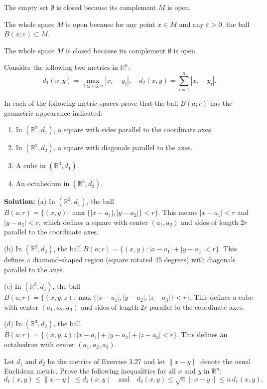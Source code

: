 The empty set $\emptyset$ is closed because its complement $M$ is open.

The whole space $M$ is open because for any point $x \in M$ and any $\varepsilon > 0$, the ball $B(x;\varepsilon) \subset M$.

The whole space $M$ is closed because its complement $\emptyset$ is open.

\begin{problembox}
Consider the following two metrics in \( \mathbb{R}^n \):
\[d_1(x, y) = \max_{1 \leq i \leq n} |x_i - y_i|, \quad d_2(x, y) = \sum_{i=1}^n |x_i - y_i|.\]

In each of the following metric spaces prove that the ball \( B(a; r) \) has the geometric appearance indicated:
\begin{enumerate}[label=\alph*)]
\item In \( (\mathbb{R}^2, d_1) \), a square with sides parallel to the coordinate axes.
\item In \( (\mathbb{R}^2, d_2) \), a square with diagonals parallel to the axes.
\item A cube in \( (\mathbb{R}^3, d_1) \).
\item An octahedron in \( (\mathbb{R}^3, d_2) \).
\end{enumerate}
\end{problembox}

\textbf{Solution:} 
(a) In $(\mathbb{R}^2, d_1)$, the ball $B(a;r) = \{(x,y) : \max\{|x-a_1|, |y-a_2|\} < r\}$. This means $|x-a_1| < r$ and $|y-a_2| < r$, which defines a square with center $(a_1,a_2)$ and sides of length $2r$ parallel to the coordinate axes.

(b) In $(\mathbb{R}^2, d_2)$, the ball $B(a;r) = \{(x,y) : |x-a_1| + |y-a_2| < r\}$. This defines a diamond-shaped region (square rotated 45 degrees) with diagonals parallel to the axes.

(c) In $(\mathbb{R}^3, d_1)$, the ball $B(a;r) = \{(x,y,z) : \max\{|x-a_1|, |y-a_2|, |z-a_3|\} < r\}$. This defines a cube with center $(a_1,a_2,a_3)$ and sides of length $2r$ parallel to the coordinate axes.

(d) In $(\mathbb{R}^3, d_2)$, the ball $B(a;r) = \{(x,y,z) : |x-a_1| + |y-a_2| + |z-a_3| < r\}$. This defines an octahedron with center $(a_1,a_2,a_3)$.

\begin{problembox}
Let \( d_1 \) and \( d_2 \) be the metrics of Exercise 3.27 and let \( \|x - y\| \) denote the usual Euclidean metric. Prove the following inequalities for all \( x \) and \( y \) in \( \mathbb{R}^n \):
\[d_1(x, y) \leq \|x - y\| \leq d_2(x, y) \quad \text{and} \quad d_2(x, y) \leq \sqrt{n} \|x - y\| \leq n\,d_1(x, y).\]
\end{problembox}

